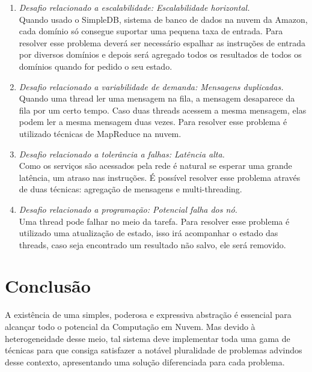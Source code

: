 \documentclass{llncs}
\begin{document}
\begin{enumerate}
\item \emph{Desafio relacionado a escalabilidade: Escalabilidade horizontal.} \\
Quando usado o SimpleDB, sistema de banco de dados na nuvem da Amazon, cada domínio só consegue suportar uma pequena taxa de entrada. Para resolver esse problema deverá ser necessário espalhar as instruções de entrada por diversos domínios e depois será agregado todos os resultados de todos os domínios quando for pedido o seu estado.\cite{liu} \\

\item \emph{Desafio relacionado a variabilidade de demanda: Mensagens duplicadas.} \\
Quando uma thread ler uma mensagem na fila, a mensagem desaparece da fila por um certo tempo. Caso duas threads acessem a mesma mensagem, elas podem ler a mesma mensagem duas vezes. Para resolver esse problema é utilizado técnicas de MapReduce na nuvem.\cite{liu} \\

\item \emph{Desafio relacionado a tolerância a falhas: Latência alta.} \\
Como os serviços são acessados pela rede é natural se esperar uma grande latência, um atraso nas instruções. É possível resolver esse problema através de duas técnicas: agregação de mensagens e multi-threading.\cite{liu} \\

\item \emph{Desafio relacionado a programação: Potencial falha dos nó.} \\
Uma thread pode falhar no meio da tarefa. Para resolver esse problema é utilizado uma atualização de estado, isso irá acompanhar o estado das threads, caso seja encontrado um resultado não salvo, ele será removido. \\
\end{enumerate}

\section{Conclusão}
A existência de uma simples, poderosa e expressiva abstração é essencial para alcançar todo o potencial da Computação em Nuvem. Mas devido à heterogeneidade desse meio, tal sistema deve implementar toda uma gama de técnicas para que consiga satisfazer a notável pluralidade de problemas advindos desse contexto, apresentando uma solução diferenciada para cada problema.
\end{document}
